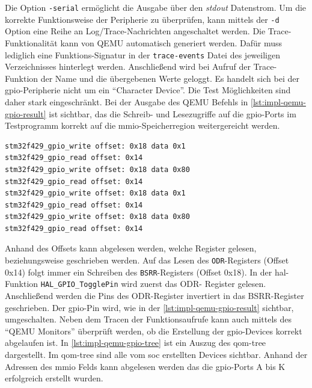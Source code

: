 Die Option \texttt{-serial} ermöglicht die Ausgabe über den \textit{stdout}
Datenstrom. 
Um die korrekte Funktionsweise der Peripherie zu überprüfen, kann mittels der
\texttt{-d} Option eine Reihe an Log/Trace-Nachrichten angeschaltet werden.
Die Trace-Funktionalität kann von QEMU automatisch generiert werden.
Dafür muss lediglich eine Funktions-Signatur in der \texttt{trace-events} Datei
des jeweiligen Verzeichnisses hinterlegt werden.
Anschließend wird bei Aufruf der Trace-Funktion der Name und die übergebenen
Werte geloggt.
\newline
Es handelt sich bei der \ac{gpio}-Peripherie nicht um ein \enquote{Character
Device}.
Die Test Möglichkeiten sind daher stark eingeschränkt.
Bei der Ausgabe des QEMU Befehls in \ref{lst:impl-qemu-gpio-result} ist
sichtbar, das die Schreib- und Lesezugriffe auf die \ac{gpio}-Ports im
Testprogramm korrekt auf die \ac{mmio}-Speicherregion weitergereicht werden.

\begin{minipage}{\linewidth}
\begin{lstlisting}[language=sh,numbers=none,
                label={lst:impl-qemu-gpio-result},
                caption=QEMU Ausgabe der GPIO Peripherie]
stm32f429_gpio_write offset: 0x18 data 0x1
stm32f429_gpio_read offset: 0x14
stm32f429_gpio_write offset: 0x18 data 0x80
stm32f429_gpio_read offset: 0x14
stm32f429_gpio_write offset: 0x18 data 0x1
stm32f429_gpio_read offset: 0x14
stm32f429_gpio_write offset: 0x18 data 0x80
stm32f429_gpio_read offset: 0x14
\end{lstlisting}
\end{minipage}

Anhand des Offsets kann abgelesen werden, welche Register gelesen,
beziehungsweise geschrieben werden.
Auf das Lesen des \texttt{ODR}-Registers (Offset 0x14) folgt immer ein
Schreiben des \texttt{BSRR}-Registers (Offset 0x18).
In der \ac{hal}-Funktion \texttt{HAL\_GPIO\_TogglePin} wird zuerst das ODR-
Register gelesen.
Anschließend werden die Pins des ODR-Register invertiert in das BSRR-Register
geschrieben\cite{Stm32HalMan}.
Der \ac{gpio}-Pin wird, wie in der \ref{lst:impl-qemu-gpio-result} sichtbar,
umgeschalten.
\newline
Neben dem Tracen der Funktionsaufrufe kann auch mittels des \enquote{QEMU
Monitors} überprüft werden, ob die Erstellung der \ac{gpio}-Devices korrekt
abgelaufen ist.
In \ref{lst:impl-qemu-gpio-tree} ist ein Auszug des \ac{qom}-tree dargestellt.
Im \ac{qom}-tree sind alle vom \ac{soc} erstellten Devices sichtbar.
Anhand der Adressen des \ac{mmio} Felds kann abgelesen werden das die
\ac{gpio}-Ports A bis K erfolgreich erstellt wurden.

